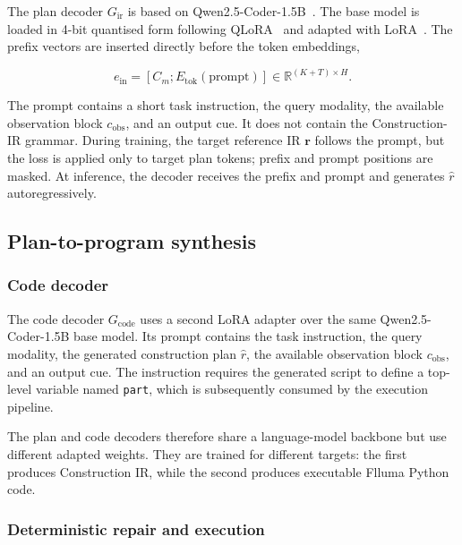\documentclass[preprint,12pt]{elsarticle}
\begin{document}
The plan decoder $G_{\mathrm{ir}}$ is based on
Qwen2.5-Coder-1.5B~\cite{yang2025qwen25}. The base model is loaded in 4-bit
quantised form following QLoRA~\cite{dettmers2023qlora} and adapted with
LoRA~\cite{hu2021lora}. The prefix vectors are inserted directly before the
token embeddings,

\begin{equation}
  e_{\mathrm{in}}
  =
  \left[
    C_m;
    E_{\mathrm{tok}}(\mathrm{prompt})
    \right]
  \in
  \mathbb{R}^{(K+T)\times H}.
\end{equation}

The prompt contains a short task instruction, the query modality, the
available observation block $c_{\mathrm{obs}}$, and an output cue. It does not
contain the Construction-IR grammar. During training, the target reference IR
$\mathbf{r}$ follows the prompt, but the loss is applied only to target plan
tokens; prefix and prompt positions are masked. At inference, the decoder
receives the prefix and prompt and generates $\hat{r}$ autoregressively.


\subsection{Plan-to-program synthesis}
\label{sec:program_synthesis}

\subsubsection{Code decoder}
\label{sec:code_decoder}

The code decoder $G_{\mathrm{code}}$ uses a second LoRA adapter over the same
Qwen2.5-Coder-1.5B base model. Its prompt contains the task instruction, the
query modality, the generated construction plan $\hat{r}$, the available
observation block $c_{\mathrm{obs}}$, and an output cue. The instruction
requires the generated script to define a top-level variable named
\texttt{part}, which is subsequently consumed by the execution pipeline.

The plan and code decoders therefore share a language-model backbone but use
different adapted weights. They are trained for different targets: the first
produces Construction IR, while the second produces executable Flluma Python
code.


\subsubsection{Deterministic repair and execution}
\label{sec:repair_and_exec}
\end{document}
